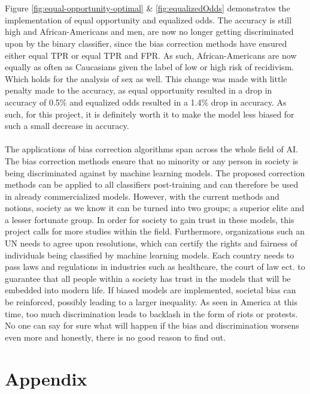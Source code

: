 \documentclass[11pt, fleqn, titlepage]{article}
\begin{document}
	\\\\
	Figure \ref{fig:equal-opportunity-optimal} \& \ref{fig:equalizedOdds} demonstrates the implementation of equal opportunity and equalized odds. The accuracy is still high and African-Americans and men, are now no longer getting discriminated upon by the binary classifier, since the bias correction methods have ensured either equal TPR or equal TPR and FPR. As such, African-Americans are now equally as often as Caucasians given the label of low or high risk of recidivism. Which holds for the analysis of sex as well. This change was made with little penalty made to the accuracy, as equal opportunity resulted in a drop in accuracy of 0.5\% and equalized odds resulted in a 1.4\% drop in accuracy. As such, for this project, it is definitely worth it to make the model less biased for such a small decrease in accuracy. 
	\\\\
	The applications of bias correction algorithms span across the whole field of AI. The bias correction methods ensure that no minority or any person in society is being discriminated against by machine learning models. The proposed correction methods can be applied to all classifiers post-training and can therefore be used in already commercialized models. However, with the current methods and notions, society as we know it can be turned into two groups; a superior elite and a lesser fortunate group. In order for society to gain trust in these models, this project calls for more studies within the field. Furthermore, organizations such an UN needs to agree upon resolutions, which can certify the rights and fairness of individuals being classified by machine learning models. Each country needs to pass laws and regulations in industries such as healthcare, the court of law ect. to guarantee that all people within a society has trust in the models that will be embedded into modern life. If biased models are implemented, societal bias can be reinforced, possibly leading to a larger inequality. As seen in America at this time, too much discrimination leads to backlash in the form of riots or protests. No one can say for sure what will happen if the bias and discrimination worsens even more and honestly, there is no good reason to find out.
	
	
	\section{Appendix} \label{appendix}
	
\end{document}
